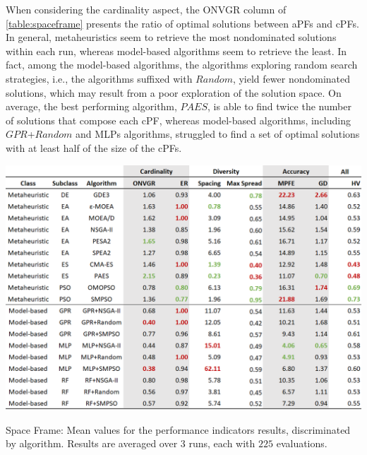 When considering the cardinality aspect, the \ac{ONVGR} column of \cref{table:spaceframe} presents the ratio of optimal solutions between \acp{aPF} and \acp{cPF}. In general, metaheuristics seem to retrieve the most nondominated solutions within each run, whereas model-based algorithms seem to retrieve the least. In fact, among the model-based algorithms, the algorithms exploring random search strategies, i.e., the algorithms suffixed with $Random$, yield fewer nondominated solutions, which may result from a poor exploration of the solution space. On average, the best performing algorithm, $PAES$, is able to find twice the number of solutions that compose each \ac{cPF}, whereas model-based algorithms, including $GPR$+$Random$ and \acp{MLP} algorithms, struggled to find a set of optimal solutions with at least half of the size of the \acp{cPF}. 
\begin{table}[h!]
	\centering
	\includegraphics[width=\textwidth]{Images/Evaluation/caadria/Results_Mean_20190428.PNG}
	\caption[Space Frame: Mean values for the performance indicators results, discriminated per algorithms]{Space Frame: Mean values for the performance indicators results, discriminated by algorithm. Results are averaged over $3$ runs, each with $225$ evaluations.}
	\label{table:spaceframe}
\end{table}

